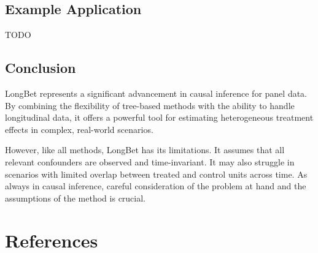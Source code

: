 \documentclass[
  letterpaper,
  DIV=11,
  numbers=noendperiod]{scrreprt}
\begin{document}
\section{Example Application}\label{example-application}

TODO

\section{Conclusion}\label{conclusion-5}

LongBet represents a significant advancement in causal inference for
panel data. By combining the flexibility of tree-based methods with the
ability to handle longitudinal data, it offers a powerful tool for
estimating heterogeneous treatment effects in complex, real-world
scenarios.

However, like all methods, LongBet has its limitations. It assumes that
all relevant confounders are observed and time-invariant. It may also
struggle in scenarios with limited overlap between treated and control
units across time. As always in causal inference, careful consideration
of the problem at hand and the assumptions of the method is crucial.


\chapter{References}\label{references}
\end{document}
